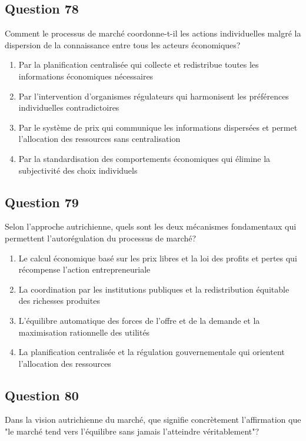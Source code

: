 \documentclass[12pt,a4paper]{article}
\begin{document}
\bigskip


\subsection*{Question 78}
Comment le processus de marché coordonne-t-il les actions individuelles malgré la dispersion de la connaissance entre tous les acteurs économiques?

\begin{enumerate}[label=\Alph*., leftmargin=*]
\item Par la planification centralisée qui collecte et redistribue toutes les informations économiques nécessaires
\item Par l'intervention d'organismes régulateurs qui harmonisent les préférences individuelles contradictoires
\item Par le système de prix qui communique les informations dispersées et permet l'allocation des ressources sans centralisation
\item Par la standardisation des comportements économiques qui élimine la subjectivité des choix individuels
\end{enumerate}

\bigskip


\subsection*{Question 79}
Selon l'approche autrichienne, quels sont les deux mécanismes fondamentaux qui permettent l'autorégulation du processus de marché?

\begin{enumerate}[label=\Alph*., leftmargin=*]
\item Le calcul économique basé sur les prix libres et la loi des profits et pertes qui récompense l'action entrepreneuriale
\item La coordination par les institutions publiques et la redistribution équitable des richesses produites
\item L'équilibre automatique des forces de l'offre et de la demande et la maximisation rationnelle des utilités
\item La planification centralisée et la régulation gouvernementale qui orientent l'allocation des ressources
\end{enumerate}

\bigskip


\subsection*{Question 80}
Dans la vision autrichienne du marché, que signifie concrètement l'affirmation que "le marché tend vers l'équilibre sans jamais l'atteindre véritablement"?
\end{document}
